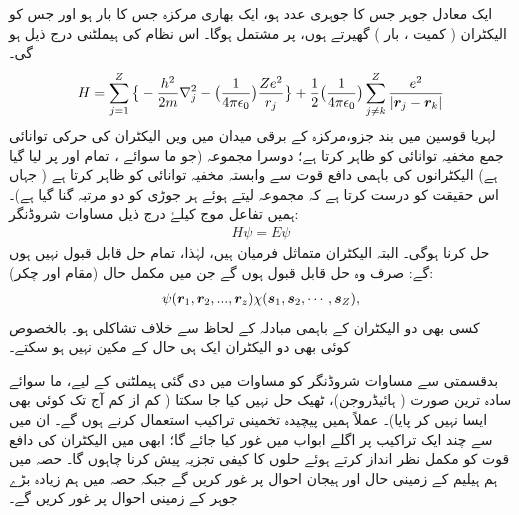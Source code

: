 ایک معادل جوہر جس کا جوہری عدد  ہو، ایک بھاری مرکزہ جس کا بار  ہو اور جس کو  الیکٹران ( کمیت ، بار ) گھیرتے ہوں، پر مشتمل ہوگا۔ اس نظام کی ہیملٹنی درج ذیل ہو گی۔
\begin{align}\label{مساوات_متماثل_ہیملٹنی_جوہر_عمومی}
H=\sum_{j=1}^{Z} \big\{ -\frac{h^2}{2m}\nabla_j^2-\big(\frac{1}{4\pi\epsilon_{0}}\big) \frac{Ze^2}{r_{j}} \big\} + \frac{1}{2}\big(\frac{1}{4\pi\epsilon_{0}}\big) \sum_{j\ne k}^{Z} \frac{e^2}{|{{\boldsymbol{r}}}_{j} - {{\boldsymbol{r}}}_{k} |}
\end{align}
لہریا قوسین میں بند جزو،مرکزہ کے برقی میدان میں  ویں الیکٹران کی حرکی توانائی جمع مخفیہ توانائی کو ظاہر کرتا ہے؛ دوسرا مجموعہ (جو ما سوائے ، تمام  اور  پر لیا گیا ہے) الیکٹرانوں کی باہمی دافع قوت سے وابستہ مخفیہ توانائی کو ظاہر کرتا ہے ( جہاں  اس حقیقت کو درست کرتا ہے کہ مجموعہ لیتے ہوئے ہر جوڑی کو دو مرتبہ گنا گیا ہے)۔ ہمیں 
 تفاعل موج  کیلۓ درج ذیل مساوات شروڈنگر:
\begin{align}\label{مساوات_متماثل_شروڈنگر_عمومی_جوہر}
 H\psi=E\psi
\end{align}
 حل کرنا ہوگی۔ البتہ الیکٹران متماثل فرمیان ہیں، لہٰذا، تمام حل قابل قبول نہیں ہوں گے: صرف وہ حل قابل قبول ہوں گے جن میں مکمل حال (مقام اور چکر):
\begin{align}
 \psi({{\boldsymbol{r}}}_{1},{{\boldsymbol{r}}}_{2},...,{{\boldsymbol{r}}}_{z}) \chi({{\boldsymbol{s}}}_{1},{{\boldsymbol{s}}}_{2},\cdots,{{\boldsymbol{s}}}_{Z}), 
\end{align}
کسی بھی دو الیکٹران کے باہمی مبادلہ کے لحاظ سے خلاف تشاکلی ہو۔ بالخصوص کوئی بھی دو الیکٹران ایک ہی حال کے مکین نہیں ہو سکتے۔

 بدقسمتی سے مساوات شروڈنگر کو مساوات  میں دی گئی ہیملٹنی کے لیے، ما سوائے سادہ ترین صورت ( ہائیڈروجن)، ٹھیک حل نہیں کیا جا سکتا ( کم از کم آج تک کوئی بھی ایسا نہیں کر پایا)۔ عملاً ہمیں پیچیدہ تخمینی تراکیب استعمال کرنے ہوں گے۔ ان میں سے چند ایک تراکیب پر اگلے ابواب میں غور کیا جائے گا؛ ابھی میں الیکٹران کی دافع قوت کو مکمل نظر انداز کرتے ہوئے حلوں کا کیفی تجزیہ پیش کرنا چاہوں گا۔ حصہ  میں ہم ہیلیم کے زمینی حال اور ہیجان احوال پر غور کریں گے جبکہ حصہ  میں ہم زیادہ بڑے جوہر کے زمینی احوال پر غور کریں گے۔

